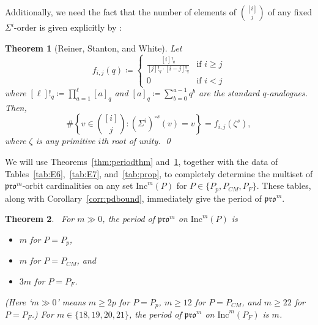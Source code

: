 \documentclass[12pt]{amsart}
\newtheorem{theorem}{Theorem}[section]
\theoremstyle{definition}
\theoremstyle{remark}
\numberwithin{equation}{section}
\newcommand{\inc}{\ensuremath{\mathrm{Inc}}}
\newcommand{\pro}{\mathfrak{pro}}
\begin{document}
 Additionally, we need the fact that the number of elements of $\binom{[i]}{j}$ of any fixed $\Sigma^i$-order is given explicitly by \cite[Theorem~1.1(b)]{Reiner.Stanton.White}:
\begin{theorem}[Reiner, Stanton, and White]\label{thm:rsw}
Let 
\begin{equation*}
f_{i,j}(q) \coloneqq 
\begin{cases}
 \frac{[i]!_q}{[j]!_q\cdot [i-j]!_q} & \text{if } i \geq j \\
 0 & \text{if } i < j 
\end{cases}
\end{equation*}
where $[\ell]!_q \coloneqq \prod_{a=1}^\ell [a]_q$ and $[a]_q \coloneqq \sum_{b = 0}^{a-1} q^b$ are the standard $q$-analogues. Then, 
\[\#\left\{ v \in \binom{[i]}{j} : (\Sigma^i)^{\circ s}(v) = v \right\} = f_{i,j}(\zeta^s),\] where $\zeta$ is any primitive $i$th root of unity. \qed
\end{theorem} 
We will use Theorems~\ref{thm:periodthm} and~\ref{thm:rsw}, together with the data of Tables~\ref{tab:E6},~\ref{tab:E7}, and~\ref{tab:prop}, to completely determine the multiset of $\pro^m$-orbit cardinalities on any set $\inc^m(P)$ for $P \in \{P_p, P_{CM}, P_F \}$. These tables, along with Corollary~\ref{corr:pdbound}, immediately give the period of $\pro^m$.
\\
\begin{theorem}~\label{thm:actualpdbound}
For $m \gg 0$, the period of $\pro^m$ on $\inc^m(P)$ is 
\begin{itemize}
\item $m$ for $P = P_p$, 
\item $m$ for $P = P_{CM}$, and 
\item $3m$ for $P = P_F$. 
\end{itemize}
(Here `$m \gg 0$' means $m \geq 2p$ for $P = P_p$, $m \geq 12$ for $P = P_{CM}$, and $m \geq 22$ for $P = P_F$.) For $m \in \lbrace 18,19,20, 21 \rbrace$, the period of $\pro^m$ on $\inc^m(P_F)$ is $m$.
\end{theorem}
\end{document}
